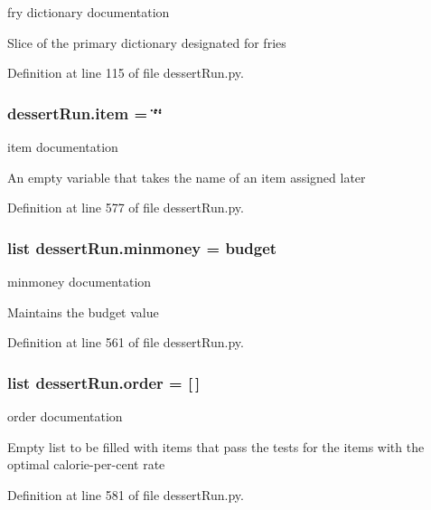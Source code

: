 fry dictionary documentation 

Slice of the primary dictionary designated for fries 

Definition at line 115 of file dessert\-Run.\-py.

\hypertarget{namespacedessertRun_a684b1ba20583e1d1e8153054e40dc98f}{
\subsubsection[{item}]{\setlength{\rightskip}{0pt plus 5cm}dessert\-Run.\-item = \char`\"{}\char`\"{}}}\label{namespacedessertRun_a684b1ba20583e1d1e8153054e40dc98f}


item documentation 

An empty variable that takes the name of an item assigned later 

Definition at line 577 of file dessert\-Run.\-py.

\hypertarget{namespacedessertRun_a71cc6704fe017182a8eccb8be7332e5c}{
\subsubsection[{minmoney}]{\setlength{\rightskip}{0pt plus 5cm}list dessert\-Run.\-minmoney = {\bf budget}}}\label{namespacedessertRun_a71cc6704fe017182a8eccb8be7332e5c}


minmoney documentation 

Maintains the budget value 

Definition at line 561 of file dessert\-Run.\-py.

\hypertarget{namespacedessertRun_abd41e31de1fe74c6ab5973862f86677e}{
\subsubsection[{order}]{\setlength{\rightskip}{0pt plus 5cm}list dessert\-Run.\-order = \mbox{[}$\,$\mbox{]}}}\label{namespacedessertRun_abd41e31de1fe74c6ab5973862f86677e}


order documentation 

Empty list to be filled with items that pass the tests for the items with the optimal calorie-\/per-\/cent rate 

Definition at line 581 of file dessert\-Run.\-py.

